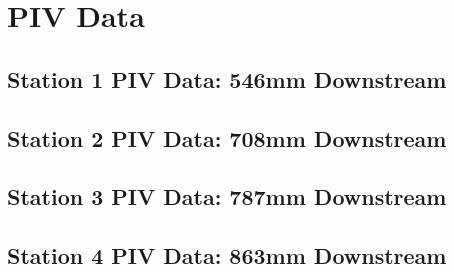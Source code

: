 
\chapter{PIV Data}

\section{Station 1 PIV Data: 546mm Downstream}












\section{Station 2 PIV Data: 708mm Downstream}












\section{Station 3 PIV Data: 787mm Downstream}












\section{Station 4 PIV Data: 863mm Downstream}












